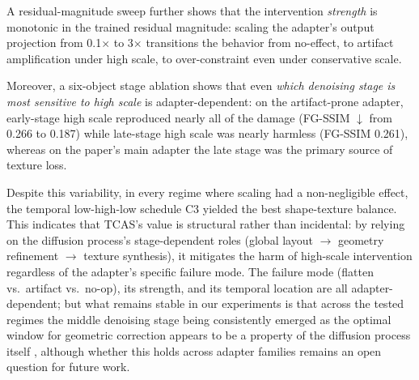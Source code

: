\documentclass[times,twocolumn,final]{elsarticle}
\providecommand{\DIFadd}[1]{{\protect\color{blue} \sf #1}} %
\providecommand{\DIFdel}[1]{{\protect\color{red} \scriptsize #1}} %
\providecommand{\DIFaddbegin}{} %
\providecommand{\DIFaddend}{} %
\providecommand{\DIFdelbegin}{} %
\providecommand{\DIFdelend}{} %
\newcommand{\DIFscaledelfig}{0.5}
\newlength{\DIFdelgraphicswidth} %
\newlength{\DIFdelgraphicsheight} %
\newcommand{\DIFaddincludegraphics}[2][]{{\color{blue}\fbox{\DIFOincludegraphics[#1]{#2}}}} %
\newcommand{\DIFdelincludegraphics}[2][]{%
\sbox{\DIFdelgraphicsbox}{\DIFOincludegraphics[#1]{#2}}%
\settoboxwidth{\DIFdelgraphicswidth}{\DIFdelgraphicsbox} %
\settoboxtotalheight{\DIFdelgraphicsheight}{\DIFdelgraphicsbox} %
\scalebox{\DIFscaledelfig}{%
\parbox[b]{\DIFdelgraphicswidth}{\usebox{\DIFdelgraphicsbox}\\[-\baselineskip] \rule{\DIFdelgraphicswidth}{0em}}\llap{\resizebox{\DIFdelgraphicswidth}{\DIFdelgraphicsheight}{%
\setlength{\unitlength}{\DIFdelgraphicswidth}%
\begin{picture}(1,1)%
\thicklines\linethickness{2pt} %
{\color[rgb]{1,0,0}\put(0,0){\framebox(1,1){}}}%
{\color[rgb]{1,0,0}\put(0,0){\line( 1,1){1}}}%
{\color[rgb]{1,0,0}\put(0,1){\line(1,-1){1}}}%
\end{picture}%
}\hspace*{3pt}}} %
} %
\DeclareRobustCommand{\DIFaddbegin}{\DIFOaddbegin \let\includegraphics\DIFaddincludegraphics} %
\DeclareRobustCommand{\DIFaddend}{\DIFOaddend \let\includegraphics\DIFOincludegraphics} %
\DeclareRobustCommand{\DIFdelbegin}{\DIFOdelbegin \let\includegraphics\DIFdelincludegraphics} %
\DeclareRobustCommand{\DIFdelend}{\DIFOaddend \let\includegraphics\DIFOincludegraphics} %
\begin{document}
A residual-magnitude sweep further shows that the intervention \emph{strength} is monotonic in the trained residual magnitude: scaling the adapter's output projection from 0.1$\times$ to 3$\times$ transitions the behavior from no-effect, to artifact amplification under high scale, to over-constraint even under conservative scale.

Moreover, a \DIFaddbegin \DIFadd{six-object }\DIFaddend stage ablation shows that even \emph{which denoising stage is most sensitive to high scale} is adapter-dependent: on the artifact-prone adapter, early-stage high scale reproduced nearly all of the damage (FG-SSIM $\downarrow$ from 0.266 to 0.187) while late-stage high scale was nearly harmless (FG-SSIM 0.261), whereas on the paper's main adapter the late stage was the primary source of texture loss.

Despite this variability, in every regime where scaling had a non-negligible effect, the temporal low-high-low schedule C3 yielded the best shape-texture balance. This indicates that TCAS's value is structural rather than incidental: by relying on the diffusion process's stage-dependent roles (global layout $\to$ geometry refinement $\to$ texture synthesis), it mitigates the harm of high-scale intervention regardless of the adapter's specific failure mode. The failure mode (flatten vs.\ artifact vs.\ no-op), its strength, and its temporal location are all adapter-dependent; \DIFdelbegin \DIFdel{but }\DIFdelend \DIFaddbegin \DIFadd{what remains stable in our experiments is that across the tested regimes }\DIFaddend the middle denoising stage \DIFdelbegin \DIFdel{being }\DIFdelend \DIFaddbegin \DIFadd{consistently emerged as }\DIFaddend the optimal window for geometric correction\DIFdelbegin \DIFdel{appears to be a property of the diffusion process itself}\DIFdelend \DIFaddbegin \DIFadd{, although whether this holds across adapter families remains an open question for future work.
}
\end{document}
